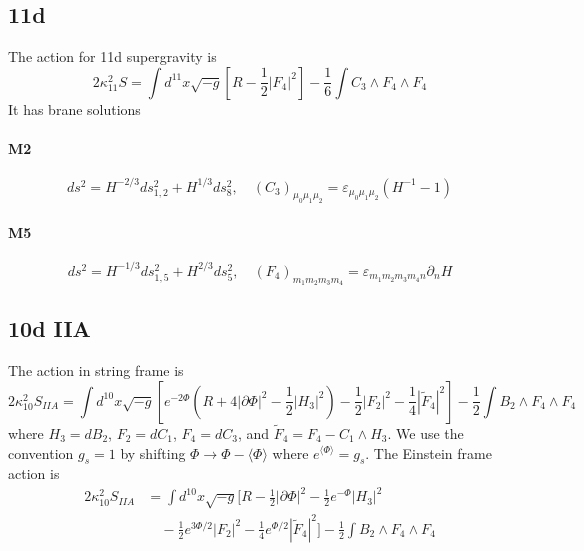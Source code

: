 \subsection{11d}
\label{sec:11d branes}
The action for 11d supergravity is
\begin{equation}
2\kappa_{11}^2 S = 
\int d^{11}x\sqrt{-g}\left[
    R-\frac{1}{2}| F_4|^2
\right]
-\frac{1}{6}\int  C_3 \wedge  F_4 \wedge  F_4
\end{equation}
It has brane solutions
\paragraph{M2}
\begin{equation}
ds^2 = H^{-2/3}ds_{1,2}^2 + H^{1/3}ds_8^2,\quad
(C_3)_{\mu_0 \mu_1 \mu_2} = \varepsilon_{\mu_0 \mu_1 \mu_2}(H^{-1}-1)
\end{equation}

\paragraph{M5}
\begin{equation}
ds^2 = H^{-1/3}ds_{1,5}^2 + H^{2/3}ds_5^2,\quad
(F_4)_{m_1 m_2 m_3 m_4} = \varepsilon_{m_1 m_2 m_3 m_4 n} \partial_n H
\end{equation}

\subsection{10d IIA}
\label{sec:10d IIA branes}
The action in string frame is
\begin{equation}
2\kappa_{10}^2 S_{IIA} =
\int d^{10}x\sqrt{-g}\left[
    e^{-2\Phi}\left(R+4|\partial\Phi|^2-\frac{1}{2}|H_3|^2\right)
    -\frac{1}{2}|F_2|^2-\frac{1}{4}|\tilde{F}_4|^2
\right]
-\frac{1}{2}\int B_2 \wedge F_4 \wedge F_4
\end{equation}
where $H_3 = dB_2$, $F_2 = dC_1$, $F_4 = dC_3$, and $\tilde{F}_4 = F_4 - C_1 \wedge H_3$.
We use the convention $g_s = 1$ by shifting $\Phi \to \Phi - \langle\Phi\rangle$ where $e^{\langle\Phi\rangle} = g_s$.
The Einstein frame action is
\begin{equation}
\begin{aligned}
2\kappa_{10}^2 S_{IIA}
&= \int d^{10}x\sqrt{-g}\Bigg[
    R - \frac{1}{2}|\partial\Phi|^2 - \frac{1}{2}e^{-\Phi}|H_3|^2 \\
    &\quad - \frac{1}{2}e^{3\Phi/2}|F_2|^2 - \frac{1}{4}e^{\Phi/2}|\tilde{F}_4|^2
\Bigg]
- \frac{1}{2}\int B_2 \wedge F_4 \wedge F_4
\end{aligned}
\end{equation}

